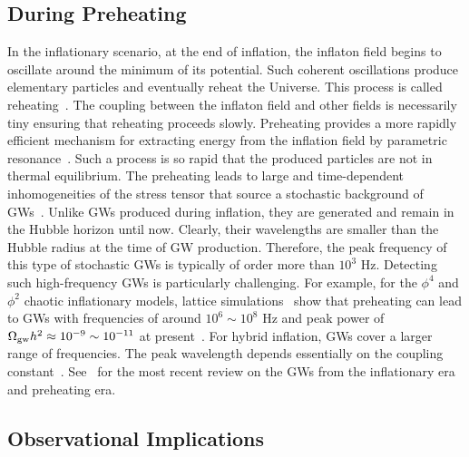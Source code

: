 \documentclass[a4paper,11pt]{article}
\begin{document}
\subsection{During Preheating}
\label{subsec:preheating}


In the inflationary scenario, at the end of inflation, the inflaton field begins to oscillate around the minimum of its potential. Such coherent oscillations produce elementary particles and eventually reheat the Universe. This process is called reheating~\cite{Albrecht:1982mp}. The coupling between the inflaton field and other fields is necessarily tiny ensuring that reheating proceeds slowly. Preheating provides a more rapidly efficient mechanism for extracting energy from the inflation field by parametric resonance~\cite{Traschen:1990sw}. Such a process is so rapid that the produced particles are not in thermal equilibrium. The preheating leads to large and time-dependent inhomogeneities of the stress tensor that source a stochastic background of GWs~\cite{Khlebnikov:1997di}. Unlike GWs produced during inflation, they are generated and remain in the Hubble horizon until now. Clearly, their wavelengths are smaller than the Hubble radius at the time of GW production. Therefore, the peak frequency of this type of stochastic GWs is typically of order more than $10^3$ Hz. Detecting such high-frequency GWs is particularly challenging. For example, for the $\phi^4$ and $\phi^2$ chaotic inflationary models, lattice simulations~\cite{Felder:2000hq} show that preheating can lead to GWs with frequencies of around $10^6 \sim 10^8$ Hz and peak power of $\Omega_{\rm gw}h^2 \approx 10^{-9} \sim 10^{-11}$ at present~\cite{Easther:2006gt}. For hybrid inflation, GWs cover a larger range of frequencies. The peak wavelength depends essentially on the coupling constant~\cite{Easther:2006vd}. See~\cite{Guzzetti:2016mkm} for the most recent review on the GWs from the inflationary era and preheating era.


\subsection{Observational Implications}
\label{subsec:observation}
\end{document}
